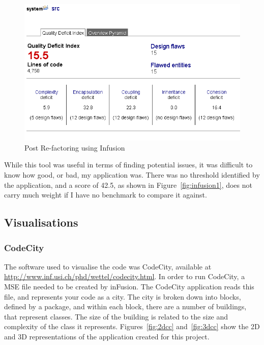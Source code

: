 \begin{figure}[H]
\begin{center}
\includegraphics[scale=0.7]{infusion2.PNG}
\caption{Post Re-factoring using Infusion}
\end{center}
\end{figure}

While this tool was useful in terms of finding potential issues, it was difficult to know how good, or bad, my application was. There was no threshold identified by the application, and a score of 42.5, as shown in Figure~\ref{fig:infusion1}, does not carry much weight if I have no benchmark to compare it against. 

\subsection{Visualisations}

\subsubsection{CodeCity}

The software used to visualise the code was CodeCity, available at \hyperref[Code City]{http://www.inf.usi.ch/phd/wettel/codecity.html}. In order to run CodeCity, a MSE file needed to be created by inFusion. The CodeCity application reads this file, and represents your code as a city. The city is broken down into blocks, defined by a package, and within each block, there are a number of buildings, that represent classes. The size of the building is related to the size and complexity of the class it represents. Figures~\ref{fig:2dcc} and~\ref{fig:3dcc} show the 2D and 3D representations of the application created for this project. 
 
